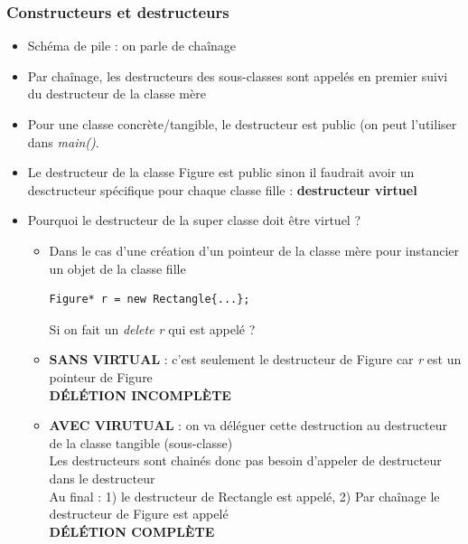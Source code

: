\documentclass[12pt,a4paper]{article}
\begin{document}
\subsubsection{Constructeurs et destructeurs}
\begin{itemize}
\item Schéma de pile : on parle de chaînage
\item Par chaînage, les destructeurs des sous-classes sont appelés en premier suivi du destructeur de la classe mère
\item Pour une classe concrète/tangible, le destructeur est public (on peut l'utiliser dans \textit{main()}.
\item Le destructeur de la classe Figure est public sinon il faudrait avoir un desctructeur spécifique pour chaque classe fille : \textbf{destructeur virtuel}
\item Pourquoi le destructeur de la super classe doit être virtuel ?
\begin{itemize}
\item Dans le cas d'une création d'un pointeur de la classe mère pour instancier un objet de la classe fille
\begin{lstlisting}
Figure* r = new Rectangle{...};
\end{lstlisting}
Si on fait un \textit{delete r} qui est appelé ?
\item \textbf{SANS VIRTUAL} : c'est seulement le destructeur de Figure car \textit{r} est un pointeur de Figure\\
\textbf{DÉLÉTION INCOMPLÈTE}
\item \textbf{AVEC VIRUTUAL} : on va déléguer cette destruction au destructeur de la classe tangible (sous-classe)\\
Les destructeurs sont chainés donc pas besoin d'appeler de destructeur dans le destructeur\\
Au final : 1) le destructeur de Rectangle est appelé, 2) Par chaînage le destructeur de Figure est appelé\\
\textbf{DÉLÉTION COMPLÈTE}

\end{itemize}
\end{itemize}
\end{document}
